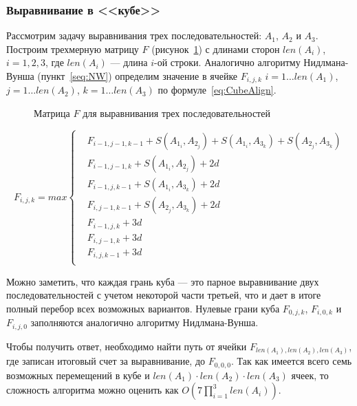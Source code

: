 \subsubsection[Выравнивание в <<кубе>>]{\large Выравнивание в <<кубе>>}
\hspace{\parindent} Рассмотрим задачу выравнивания трех последовательностей: $A_1$, $A_2$ и $A_3$. Построим трехмерную матрицу $F$ (рисунок~\ref{ris:Cube}) с длинами сторон $len(A_i)$, $i = 1,2,3$, где $len(A_i)$ --- длина $i$-ой строки. Аналогично алгоритму Нидлмана-Вунша (пункт~\ref{seq:NW}) определим значение в ячейке $F_{i,j,k}$ $i=1 \ldots len(A_1)$, $j=1 \ldots len(A_2)$, $k=1 \ldots len(A_3)$ по формуле~\ref{eq:CubeAlign}.

\begin{figure}[h]
	\caption{Матрица $F$ для выравнивания трех последовательностей}
	\label{ris:Cube}
\end{figure}

\begin{equation}\label{eq:CubeAlign}
F_{i,j,k} = max\left\{
	\begin{aligned}
		& F_{i-1,j-1,k-1} + S(A_{1_i},A_{2_j}) + S(A_{1_i},A_{3_k}) + S(A_{2_j},A_{3_k})\\
		& F_{i-1,j-1,k} + S(A_{1_i},A_{2_j}) + 2d\\
		& F_{i-1,j,k-1} + S(A_{1_i},A_{3_k}) + 2d\\
		& F_{i,j-1,k-1} + S(A_{2_j},A_{3_k}) + 2d\\
		& F_{i-1,j,k} + 3d\\
		& F_{i,j-1,k} + 3d\\
		& F_{i,j,k-1} + 3d\\
	\end{aligned}
	\right.
\end{equation}

\indent Можно заметить, что каждая грань куба --- это парное выравнивание двух последовательностей с учетом некоторой части третьей, что и дает в итоге полный перебор всех возможных вариантов. Нулевые грани куба $F_{0,j,k}$, $F_{i,0,k}$ и $F_{i,j,0}$ заполняются аналогично алгоритму Нидлмана-Вунша.

\indent  Чтобы получить ответ, необходимо найти путь от ячейки $F_{len(A_1),len(A_2),len(A_3)}$, где записан итоговый счет за выравнивание, до $F_{0,0,0}$. Так как имеется всего семь возможных перемещений в кубе и $len(A_1) \cdot len(A_2) \cdot len(A_3)$ ячеек, то сложность алгоритма можно оценить как $O(7\prod\limits_{i=1}^3len(A_i))$.

